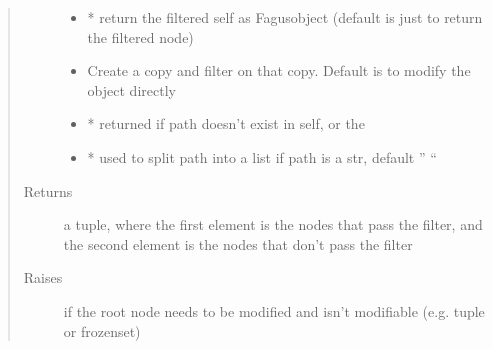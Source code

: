 \documentclass[a4paper,10pt,english]{sphinxmanual}
\begin{document}
\begin{fulllineitems}
\begin{fulllineitems}
\begin{quote}
\begin{description}
\begin{itemize}
\item {}
\sphinxAtStartPar
{} \textendash{} * return the filtered self as Fagus\sphinxhyphen{}object (default is just to return the filtered node)

\item {}
\sphinxAtStartPar
{} \textendash{} Create a copy and filter on that copy. Default is to modify the object directly

\item {}
\sphinxAtStartPar
{} \textendash{} * returned if path doesn’t exist in self, or the

\item {}
\sphinxAtStartPar
{} \textendash{} * used to split path into a list if path is a str, default ” “

\end{itemize}

\item[{Returns}] \leavevmode
\sphinxAtStartPar
a tuple, where the first element is the nodes that pass the filter, and the second element is the nodes that
don’t pass the filter

\item[{Raises}] \leavevmode
\sphinxAtStartPar
{} \textendash{} if the root node needs to be modified and isn’t modifiable (e.g. tuple or frozenset)

\end{description}\end{quote}

\end{fulllineitems}



\end{fulllineitems}
\end{document}
